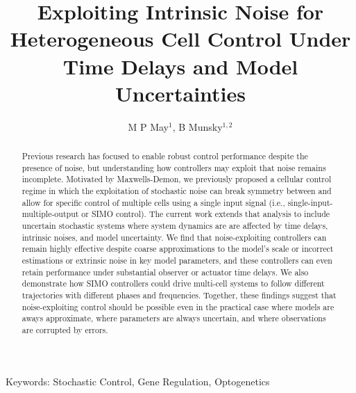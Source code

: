 \documentclass[12pt]{iopart}
\begin{document}
\def\brian[#1]{{\color{red} #1 }}
\def\michael[#1]{{\color{green} #1 }}

\title[Heterogeneous Control of Cell Differentiation Dynamics]{Exploiting Intrinsic Noise for Heterogeneous Cell Control Under Time Delays and Model Uncertainties}
\maketitle

\author{M P May$^1$, B Munsky$^{1,2}$}

\address{$^1$ School of Bioengineering, Colorado State University, Fort Collins, CO, USA}
\address{$^2$ Department of Chemical and Biological Engineering, Colorado State University, Fort Collins, CO, USA}

\begin{abstract}
Previous research has focused to enable robust control performance despite the presence of noise, but understanding how controllers may exploit that noise remains incomplete. 
Motivated by Maxwells-Demon, we previously proposed a cellular control regime in which the exploitation of stochastic noise can break symmetry between and allow for specific control of multiple cells using a single input signal (i.e., single-input-multiple-output or SIMO control).
The current work extends that analysis to include uncertain stochastic systems where system dynamics are are affected by time delays, intrinsic noises, and model uncertainty. 
We find that noise-exploiting controllers can remain highly effective despite coarse approximations to the model's scale or incorrect estimations or extrinsic noise in key model parameters, and these controllers can even retain performance under substantial observer or actuator time delays.  
We also demonstrate how SIMO controllers could drive multi-cell systems to follow different trajectories with different phases and frequencies.
Together, these findings suggest that noise-exploiting control should be possible even in the practical case where models are aways approximate, where parameters are always uncertain, and where observations are corrupted by errors.

\end{abstract}
Keywords: Stochastic Control, Gene Regulation, Optogenetics

%
%
%
\maketitle
% 
\end{document}
